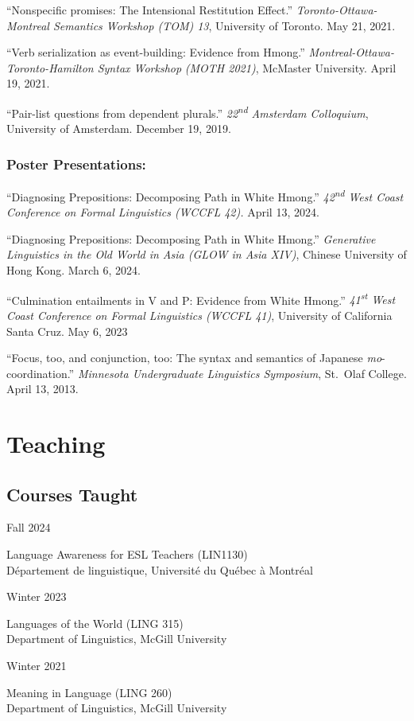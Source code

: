 \documentclass[11pt,oneside,DIV=8,parskip=off,letterpaper]{scrarticle} %
\newlength{\leftcolwidth}
\newlength{\mycolspace}
\newlength{\rightcolwidth}
\newlength{\spacingbefore}
\newlength{\spacingafter}
\newcommand{\myonecol}[1]{%
	\vspace{\spacingbefore}%
	\begin{minipage}[t]{\linewidth}%
		\strut#1%
	\end{minipage}%
	\vspace{\spacingafter}\par%
	}
\newcommand{\mytwocol}[2]{%
	\vspace{\spacingbefore}%
	\begin{minipage}[t]{\leftcolwidth}%
		\strut#1%
	\end{minipage}%
	\hspace{\mycolspace}%
	\begin{minipage}[t]{\rightcolwidth}%
		\strut#2%
	\end{minipage}%
	\vspace{\spacingafter}\par%
	}
\newcommand{\talk}[1]{%
	\myonecol{#1}%
	}
\newcommand{\cvline}[2]{%
	\mytwocol{#1}{#2}%
	}
\begin{document}
\talk{``Nonspecific promises: The Intensional Restitution Effect.'' \textit{Toronto-Ottawa-Montreal Semantics Workshop (TOM) 13}, University of Toronto. May 21, 2021.}

\talk{``Verb serialization as event-building: Evidence from Hmong.'' \textit{Montreal-Ottawa-Toronto-Hamilton Syntax Workshop} \textit{(MOTH 2021)}, McMaster University. April 19, 2021.}

\talk{``Pair-list questions from dependent plurals.'' \textit{22\textsuperscript{nd} Amsterdam Colloquium}, University of Amsterdam. December 19, 2019.}

\subsubsection{Poster Presentations:}

\talk{``Diagnosing Prepositions: Decomposing Path in White Hmong.'' \textit{42\textsuperscript{nd} West Coast Conference on Formal Linguistics (WCCFL 42).} April 13, 2024.}

\talk{``Diagnosing Prepositions: Decomposing Path in White Hmong.'' \textit{Generative Linguistics in the Old World in Asia (GLOW in Asia XIV)}, Chinese University of Hong Kong. March 6, 2024.}

\talk{``Culmination entailments in V and P: Evidence from White Hmong.'' \textit{41\textsuperscript{st} West Coast Conference on Formal Linguistics (WCCFL 41)}, University of California Santa Cruz. May 6, 2023}

\talk{``Focus, too, and conjunction, too: The syntax and semantics of Japanese \textit{mo}-coordination.'' \textit{Minnesota Undergraduate Linguistics Symposium}, St.\ Olaf College. April 13, 2013.}

\section{Teaching}

\subsection{Courses Taught}
\cvline{Fall 2024}{%
	Language Awareness for ESL Teachers (LIN1130)\\
	Département de linguistique, Université du Québec à Montréal}
\cvline{Winter 2023}{%
	Languages of the World (LING 315)\\
	Department of Linguistics, McGill University}
\cvline{Winter 2021}{%
	Meaning in Language (LING 260)\\
	Department of Linguistics, McGill University}
\end{document}
